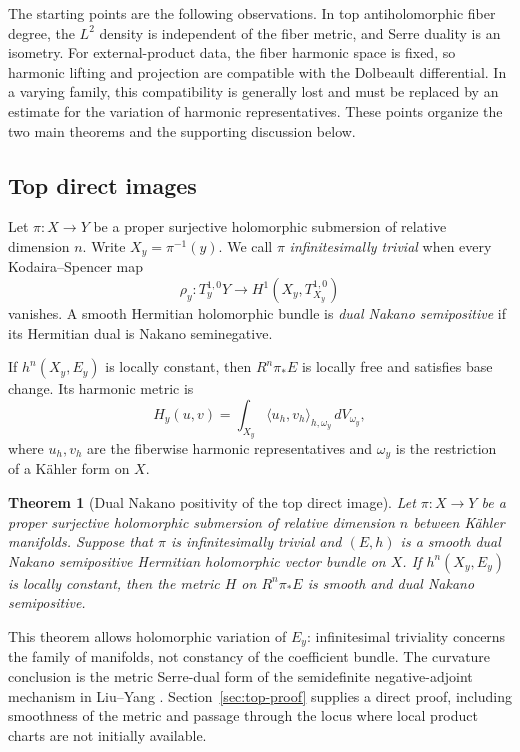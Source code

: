 \documentclass[11pt,reqno]{amsart}
\numberwithin{equation}{section}
\newtheorem{theorem}{Theorem}[section]
\theoremstyle{definition}
\theoremstyle{remark}
\newcommand{\ip}[2]{\langle #1,#2\rangle}
\begin{document}
The starting points are the following observations. In top antiholomorphic fiber degree, the $L^2$ density is independent of the fiber metric, and Serre duality is an isometry. For external-product data, the fiber harmonic space is fixed, so harmonic lifting and projection are compatible with the Dolbeault differential. In a varying family, this compatibility is generally lost and must be replaced by an estimate for the variation of harmonic representatives. These points organize the two main theorems and the supporting discussion below.

\subsection{Top direct images}
Let $\pi:X\to Y$ be a proper surjective holomorphic submersion of relative dimension $n$. Write $X_y=\pi^{-1}(y)$. We call $\pi$ \emph{infinitesimally trivial} when every Kodaira--Spencer map
\[
 \rho_y:T_y^{1,0}Y\longrightarrow H^1(X_y,T_{X_y}^{1,0})
\]
vanishes. A smooth Hermitian holomorphic bundle is \emph{dual Nakano semipositive} if its Hermitian dual is Nakano seminegative.

If $h^n(X_y,E_y)$ is locally constant, then $R^n\pi_*E$ is locally free and satisfies base change. Its harmonic metric is
\begin{equation}\label{eq:hodge}
 H_y(u,v)=\int_{X_y}\ip{u_h}{v_h}_{h,\omega_y}\,dV_{\omega_y},
\end{equation}
where $u_h,v_h$ are the fiberwise harmonic representatives and $\omega_y$ is the restriction of a K\"ahler form on $X$.

\begin{theorem}[Dual Nakano positivity of the top direct image]\label{thm:top}
Let $\pi:X\to Y$ be a proper surjective holomorphic submersion of relative dimension $n$ between K\"ahler manifolds. Suppose that $\pi$ is infinitesimally trivial and $(E,h)$ is a smooth dual Nakano semipositive Hermitian holomorphic vector bundle on $X$. If $h^n(X_y,E_y)$ is locally constant, then the metric $H$ on $R^n\pi_*E$ is smooth and dual Nakano semipositive.
\end{theorem}

This theorem allows holomorphic variation of $E_y$: infinitesimal triviality concerns the family of manifolds, not constancy of the coefficient bundle. The curvature conclusion is the metric Serre-dual form of the semidefinite negative-adjoint mechanism in Liu--Yang \cite[Theorem 4.1 and formula (4.2)]{LY14}. Section~\ref{sec:top-proof} supplies a direct proof, including smoothness of the metric and passage through the locus where local product charts are not initially available.
\end{document}
